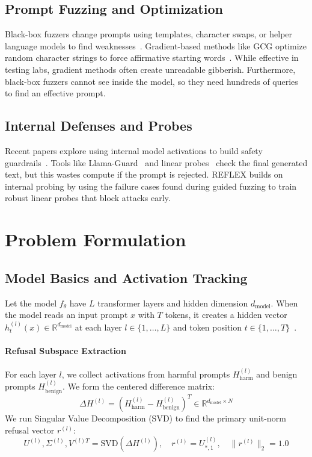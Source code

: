 \documentclass[manuscript,screen,review,anonymous]{acmart}
\begin{document}
\subsection{Prompt Fuzzing and Optimization}
Black-box fuzzers change prompts using templates, character swaps, or helper language models to find weaknesses~\cite{yu2023gptfuzzer,chao2023jailbreaking,deng2023jailbreaker}. Gradient-based methods like GCG optimize random character strings to force affirmative starting words~\cite{zou2023universal,liu2023autodan}. While effective in testing labs, gradient methods often create unreadable gibberish. Furthermore, black-box fuzzers cannot see inside the model, so they need hundreds of queries to find an effective prompt.

\subsection{Internal Defenses and Probes}
Recent papers explore using internal model activations to build safety guardrails~\cite{sharma2025constitutional,cunningham2026constitutional,zhang2025jbshield,kadali2026jailbreaking}. Tools like Llama-Guard~\cite{inan2023llama} and linear probes~\cite{alain2016understanding,belinkov2022probing} check the final generated text, but this wastes compute if the prompt is rejected. REFLEX builds on internal probing by using the failure cases found during guided fuzzing to train robust linear probes that block attacks early.

\section{Problem Formulation}

\subsection{Model Basics and Activation Tracking}
Let the model $f_\theta$ have $L$ transformer layers and hidden dimension $d_{\text{model}}$. When the model reads an input prompt $x$ with $T$ tokens, it creates a hidden vector $h_t^{(l)}(x) \in \mathbb{R}^{d_{\text{model}}}$ at each layer $l \in \{1, \dots, L\}$ and token position $t \in \{1, \dots, T\}$~\cite{elhage2021mathematical}.

\paragraph{Refusal Subspace Extraction}
For each layer $l$, we collect activations from harmful prompts $H_{\text{harm}}^{(l)}$ and benign prompts $H_{\text{benign}}^{(l)}$. We form the centered difference matrix:
\begin{equation}
\Delta H^{(l)} = \left( H_{\text{harm}}^{(l)} - H_{\text{benign}}^{(l)} \right)^T \in \mathbb{R}^{d_{\text{model}} \times N}
\end{equation}
We run Singular Value Decomposition (SVD) to find the primary unit-norm refusal vector $r^{(l)}$:
\begin{equation}
U^{(l)}, \Sigma^{(l)}, V^{(l)T} = \text{SVD}\left( \Delta H^{(l)} \right), \quad r^{(l)} = U_{*, 1}^{(l)}, \quad \|r^{(l)}\|_2 = 1.0
\end{equation}
\end{document}
